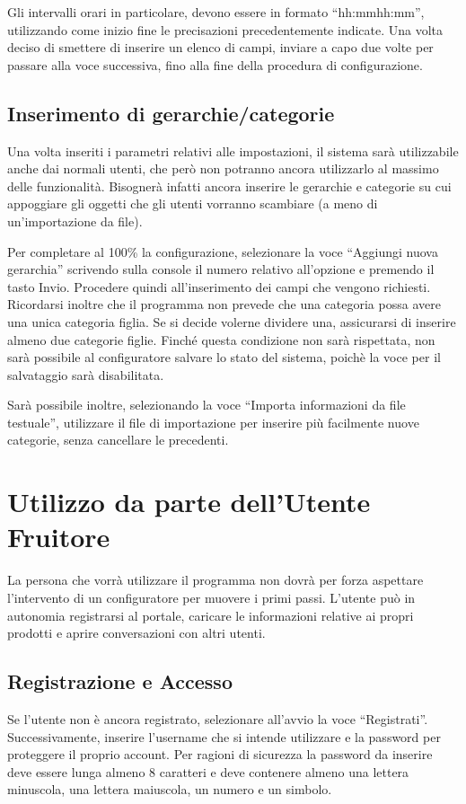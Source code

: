Gli intervalli orari in particolare, devono essere in formato ``hh:mm\-hh:mm'', utilizzando come inizio fine le precisazioni precedentemente indicate.
Una volta deciso di smettere di inserire un elenco di campi, inviare a capo due volte per passare alla voce successiva, fino alla fine della procedura di configurazione.

\subsection{Inserimento di gerarchie/categorie}
Una volta inseriti i parametri relativi alle impostazioni, il sistema sarà utilizzabile anche dai normali utenti, che però non potranno ancora utilizzarlo al massimo delle funzionalità.
Bisognerà infatti ancora inserire le gerarchie e categorie su cui appoggiare gli oggetti che gli utenti vorranno scambiare (a meno di un'importazione da file).

Per completare al 100\% la configurazione, selezionare la voce ``Aggiungi nuova gerarchia'' scrivendo sulla console il numero relativo all'opzione e premendo il tasto Invio.
Procedere quindi all'inserimento dei campi che vengono richiesti.
Ricordarsi inoltre che il programma non prevede che una categoria possa avere una unica categoria figlia. Se si decide volerne dividere una, assicurarsi di inserire almeno due categorie figlie.
Finché questa condizione non sarà rispettata, non sarà possibile al configuratore salvare lo stato del sistema, poichè la voce per il salvataggio sarà disabilitata.

Sarà possibile inoltre, selezionando la voce ``Importa informazioni da file testuale'', utilizzare il file di importazione per inserire più facilmente nuove categorie, senza cancellare le precedenti.

\section{Utilizzo da parte dell'Utente Fruitore}
La persona che vorrà utilizzare il programma non dovrà per forza aspettare l'intervento di un configuratore per muovere i primi passi. L'utente può in autonomia registrarsi al portale, caricare le informazioni
relative ai propri prodotti e aprire conversazioni con altri utenti.

\subsection{Registrazione e Accesso}
Se l'utente non è ancora registrato, selezionare all'avvio la voce ``Registrati''. Successivamente, inserire l'username che si intende utilizzare e la password per proteggere il proprio account.
Per ragioni di sicurezza la password da inserire deve essere lunga almeno 8 caratteri e deve contenere almeno una lettera minuscola, una lettera maiuscola, un numero e un simbolo.

